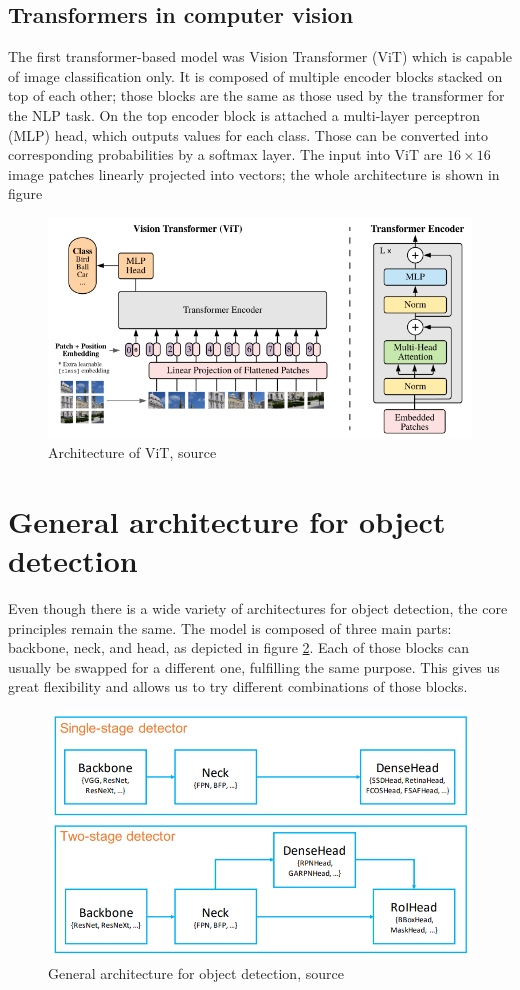 \subsection{Transformers in computer vision}
The first transformer-based model was Vision Transformer (ViT) which is capable of image classification only. It is composed of multiple encoder blocks stacked on top of each other; those blocks are the same as those used by the transformer for the NLP task. On the top encoder block is attached a multi-layer perceptron (MLP) head, which outputs values for each class. Those can be converted into corresponding probabilities by a softmax layer. The input into ViT are $16 \times 16$ image patches linearly projected into vectors; the whole architecture is shown in figure
\begin{figure}
    \centering
    \includegraphics[width=\linewidth]{images/vision_transformer.png}
    \caption{Architecture of ViT, source \cite{Dosovitskiy2020}}
    \label{fig:vision_transformer}
\end{figure}


\section{General architecture for object detection}
Even though there is a wide variety of architectures for object detection, the core principles remain the same. The model is composed of three main parts: backbone, neck, and head, as depicted in figure \ref{fig:object_detection_architecture}. Each of those blocks can usually be swapped for a different one, fulfilling the same purpose. This gives us great flexibility and allows us to try different combinations of those blocks.


\begin{figure}
    \centering
    \includegraphics[width=0.6\linewidth]{images/object_detection_architecture.png}
    \caption{General architecture for object detection, source \cite{Chen2019}}
    \label{fig:object_detection_architecture}
\end{figure}

